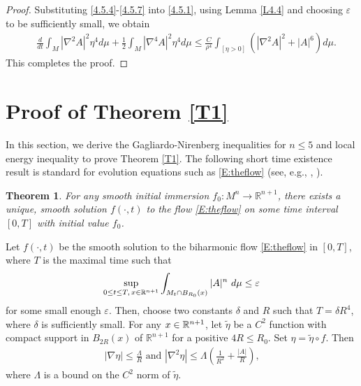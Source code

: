 \documentclass{amsart}
\newtheorem{theorem}{Theorem}[section]
\theoremstyle{definition}
\def\R{{\Bbb R}}
\numberwithin{equation}{section}
\begin{document}
\begin{proof}
Substituting \eqref{4.5.4}-\eqref{4.5.7} into \eqref{4.5.1}, using Lemma \ref{L4.4}  and choosing   $\varepsilon$  to be sufficiently small, we obtain
\begin{align}\label{4.5.8}
  \quad\frac{d}{dt} \int_{M}  \left| \nabla^{2} A \right|^{2} \eta ^{4} d\mu + \frac 12 \int_{M}  \left| \nabla^{4} A \right|^{2} \eta ^{4}
  d\mu \leq \frac C {\rho^4}\int_{\left[ \eta >0 \right] } (\left| \nabla^{2} A \right|^{2}  + |A|^6 ) d\mu \mbox{.}
\end{align}
 This completes the proof. \end{proof}



\section{Proof of Theorem  \ref{T1}}

In this section, we derive the Gagliardo-Nirenberg inequalities for $n\leq 5$ and local energy inequality to prove  Theorem  \ref{T1}.
The following short time existence result is standard for evolution
equations such as \eqref{E:theflow} (see, e.g., \cite{Baker}, \cite{HP}).
\begin{theorem} \label{T:shorttime}
  For any smooth initial immersion $f_{0} : M^n \rightarrow \mathbb{R}^{n+1}$, there exists a unique, smooth solution $f\left(\cdot,
  t\right)$ to the flow \eqref{E:theflow} on some time interval $\left[ 0, T\right]$ with initial value $f_{0}$.
\end{theorem}






Let $f(\cdot,t)$ be the smooth solution to the biharmonic flow \eqref{E:theflow} in $[0,  T]$, where $T$ is the maximal time such that
\begin{align} \label{M.0}\sup_{0 \leq t \leq T,\,
x\in\R^{n+1}} \int_{M_t\cap B_{R_0}(x)}   |A|^{n}\  d\mu \leq \varepsilon
  \end{align}
for some small enough $\varepsilon$.
Then, choose  two constants $\delta$ and $R$ such that $T= {\delta}{R^4}$, where $\delta$ is sufficiently small.
For any $x\in\R^{n+1}$, let  $\tilde
\eta$ be a $C^{2}$ function with compact support in $B_{2R}(x)$  of $\mathbb{R}^{n+1}$ for a  positive  $4R \leq R_0$. Set $\eta = \tilde
\eta \circ f$. Then
\begin{align}\label{Cut}
\left| \nabla \eta\right| \leq \frac {\Lambda}{R} \mbox{ and } \left| \nabla^{2} \eta \right| \leq \Lambda \left(\frac 1 {R^2}+\frac {
\left| A \right|}{R}
\right)
\mbox{,} \end{align}
where $\Lambda$ is a bound on the $C^{2}$ norm of $\tilde \eta$.
\end{document}
